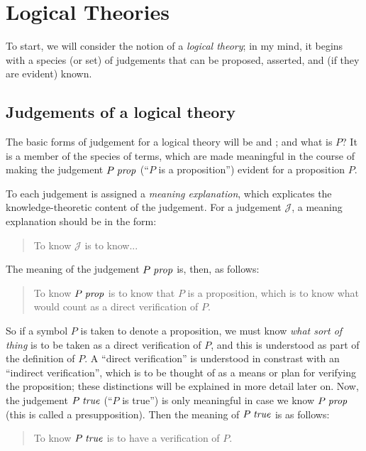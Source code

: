 \documentclass[main.tex]{subfiles}
\begin{document}
\onehalfspacing

\chapter{Logical Theories}

To start, we will consider the notion of a \emph{logical theory}; in
my mind, it begins with a species (or set) of judgements that can be
proposed, asserted, and (if they are evident) known.

\section{Judgements of a logical theory}

The basic forms of judgement for a logical theory will be
 and ; and what is $P$?
It is a member of the species of terms, which are made meaningful in
the course of making the judgement $P\;\mathit{prop}$ (``$P$ is a
proposition'') evident for a proposition $P$.

To each judgement is assigned a \emph{meaning explanation}, which explicates
the knowledge-theoretic content of the judgement. For a judgement
$\mathcal{J}$, a meaning explanation should be in the form:

\begin{quote}
  To know $\mathcal{J}$ is to know...
\end{quote}

The meaning of the judgement $P\;\mathit{prop}$ is, then, as follows:

\begin{quote}
  To know $P\;\mathit{prop}$ is to know that $P$ is a proposition, which is to know
  what would count as a direct verification of $P$.
\end{quote}

So if a symbol $P$ is taken to denote a proposition, we must know
\emph{what sort of thing} is to be taken as a direct verification of
$P$, and this is understood as part of the definition of $P$. A
``direct verification'' is understood in constrast with an ``indirect
verification'', which is to be thought of as a means or plan for
verifying the proposition; these distinctions will be explained in
more detail later on. Now, the judgement $P\;\mathit{true}$ (``$P$ is
true'') is only meaningful in case we know $P\;\mathit{prop}$ (this is
called a presupposition). Then the meaning of $P\;\mathit{true}$ is as
follows:

\begin{quote}
  To know $P\;\mathit{true}$ is to have a verification of $P$.
\end{quote}
\end{document}
